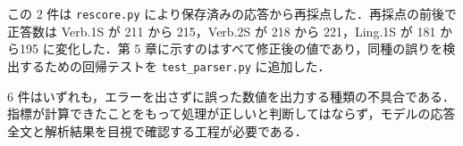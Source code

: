 この 2 件は \texttt{rescore.\allowbreak{}py} により保存済みの応答から再採点した．再採点の前後で正答数は Verb.1S が 211 から 215，Verb.2S が 218 から 221，Ling.1S が 181 から195 に変化した．第 5 章に示すのはすべて修正後の値であり，同種の誤りを検出するための回帰テストを \texttt{test\_\allowbreak{}parser.\allowbreak{}py} に追加した．

6 件はいずれも，エラーを出さずに誤った数値を出力する種類の不具合である．指標が計算できたことをもって処理が正しいと判断してはならず，モデルの応答全文と解析結果を目視で確認する工程が必要である．
